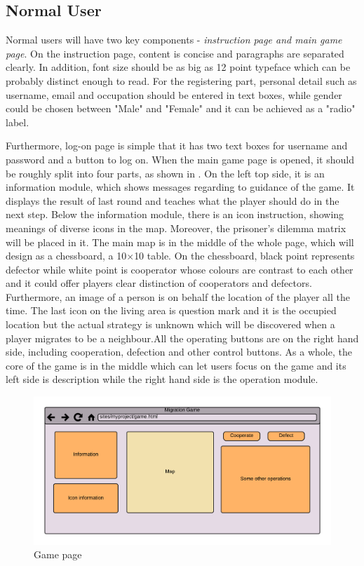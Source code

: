 \subsection{Normal User}
Normal users will have two key components - \textit{instruction page and main game page}. On the instruction page, content is concise and paragraphs are separated clearly. In addition, font size should be as big as 12 point typeface which can be probably distinct enough to read. For the registering part, personal detail such as username, email and occupation should be entered in text boxes, while gender could be chosen between "Male" and "Female" and it can be achieved as a "radio" label.

Furthermore, log-on page is simple that it has two text boxes for username and password and a button to log on. When the main game page is opened, it should be roughly split into four parts, as shown in . On the left top side, it is an information module, which shows messages regarding to guidance of the game. It displays the result of last round and teaches what the player should do in the next step. Below the information module, there is an icon instruction, showing meanings of diverse icons in the map. Moreover, the prisoner's dilemma matrix will be placed in it. The main map is in the middle of the whole page, which will design as a chessboard, a 10$\times$10 table. On the chessboard, black point represents defector while white point is cooperator whose colours are contrast to each other and it could offer players clear distinction of cooperators and defectors. Furthermore, an image of  a person is on behalf the location of the player all the time. The last icon on the living area is question mark and it is the occupied location but the actual strategy is unknown which will be discovered when a player migrates to be a neighbour.All the operating buttons are on the right hand side, including cooperation, defection and other control buttons. As a whole, the core of the game is in the middle which can let users focus on the game and its left side is description while the right hand side is the operation module.

\begin{figure}[!htb]
  \centering
  \includegraphics[width=14cm]{game_page.png}
  \caption{Game page}
  \label{Figure:fig34}
\end{figure}



